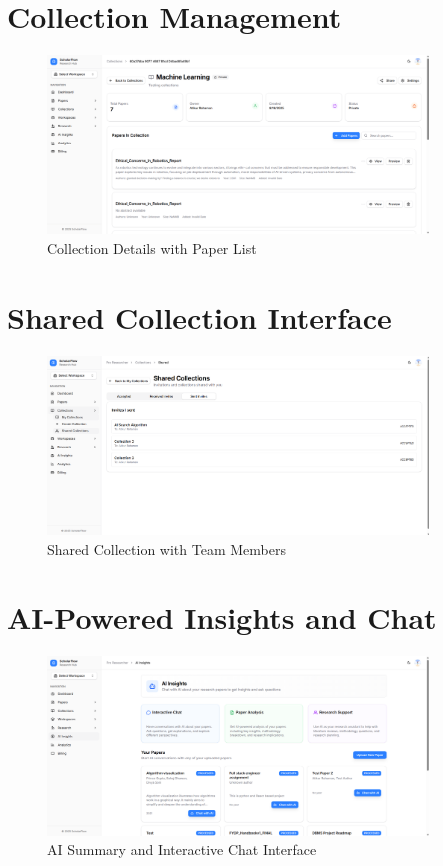 \section{Collection Management}

\begin{figure}[H]
\centering
\includegraphics[width=0.9\textwidth]{images/screenshots/collection_details.png}
\caption{Collection Details with Paper List}
\label{fig:ss-collection}
\end{figure}

\section{Shared Collection Interface}

\begin{figure}[H]
\centering
\includegraphics[width=0.9\textwidth]{images/screenshots/shared_collection.png}
\caption{Shared Collection with Team Members}
\label{fig:ss-shared-col}
\end{figure}

\section{AI-Powered Insights and Chat}

\begin{figure}[H]
\centering
\includegraphics[width=0.9\textwidth]{images/screenshots/ai_insights.png}
\caption{AI Summary and Interactive Chat Interface}
\label{fig:ss-ai}
\end{figure}

